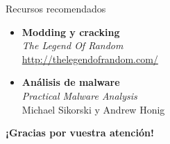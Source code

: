 \documentclass{beamer}
\begin{document}
\begin{frame}{Recursos recomendados}
\begin{itemize}
\item \textbf{Modding y cracking} \\ \hspace{4ex}\textit{The Legend Of Random} \\ \hspace{8ex}\url{http://thelegendofrandom.com/}
\vspace{6ex}
\item \textbf{Análisis de malware} \\ \hspace{4ex}\textit{Practical Malware Analysis} \\ \hspace{8ex}Michael Sikorski y Andrew Honig
\end{itemize}
\end{frame}


\begin{frame}

\begin{center}
\textbf{¡Gracias por vuestra atención!}
\end{center}

\end{frame}
\end{document}
